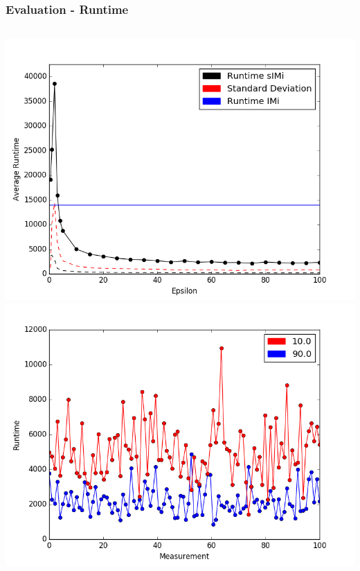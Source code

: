 \documentclass{beamer}
\begin{document}
\begin{frame}
\frametitle{The Algorithm}
\begin{center}
  }
\end{center}
\end{frame}

\begin{frame}
\frametitle{Evaluation - Runtime}
\begin{columns}
\includegraphics[width=0.95\linewidth]{data/BPI2014/BPI2014_lax_threshold_timeAllData.png}
\includegraphics[width=0.95\linewidth]{data/BPI2014/lax_10_90_runtime.png}
\end{columns}
\end{frame}
\end{document}
